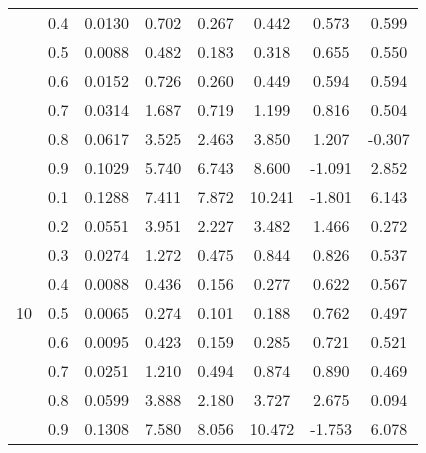 \documentclass[11pt,a4paper]{report}
\begin{document}
\begin{longtable}{ | c | c || c | c | c | c | c | c | }
 & 0.4 & 0.0130 & 0.702 & 0.267 & 0.442 & 0.573 & 0.599 \\
 & 0.5 & 0.0088 & 0.482 & 0.183 & 0.318 & 0.655 & 0.550 \\
 & 0.6 & 0.0152 & 0.726 & 0.260 & 0.449 & 0.594 & 0.594 \\
 & 0.7 & 0.0314 & 1.687 & 0.719 & 1.199 & 0.816 & 0.504 \\
 & 0.8 & 0.0617 & 3.525 & 2.463 & 3.850 & 1.207 & -0.307 \\
 & 0.9 & 0.1029 & 5.740 & 6.743 & 8.600 & -1.091 & 2.852 \\
 \hline
\multirow{9}{*}{10} & 0.1 & 0.1288 & 7.411 & 7.872 & 10.241 & -1.801 & 6.143 \\
 & 0.2 & 0.0551 & 3.951 & 2.227 & 3.482 & 1.466 & 0.272 \\
 & 0.3 & 0.0274 & 1.272 & 0.475 & 0.844 & 0.826 & 0.537 \\
 & 0.4 & 0.0088 & 0.436 & 0.156 & 0.277 & 0.622 & 0.567 \\
 & 0.5 & 0.0065 & 0.274 & 0.101 & 0.188 & 0.762 & 0.497 \\
 & 0.6 & 0.0095 & 0.423 & 0.159 & 0.285 & 0.721 & 0.521 \\
 & 0.7 & 0.0251 & 1.210 & 0.494 & 0.874 & 0.890 & 0.469 \\
 & 0.8 & 0.0599 & 3.888 & 2.180 & 3.727 & 2.675 & 0.094 \\
 & 0.9 & 0.1308 & 7.580 & 8.056 & 10.472 & -1.753 & 6.078 \\
 \hline
\hline
\end{longtable}
\end{document}
